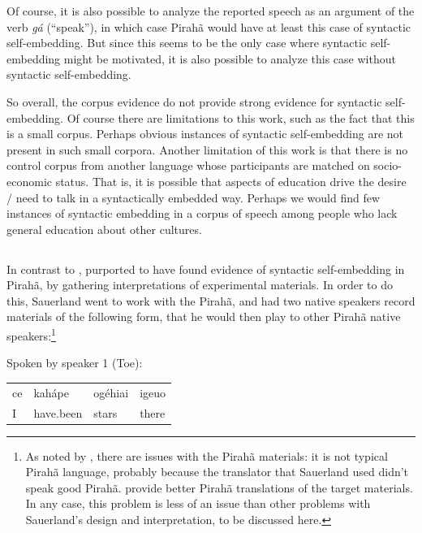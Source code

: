 \documentclass{article}
\begin{document}
Of course, it is also possible to analyze the reported speech as an argument of the verb \textit{gá} (``speak''), in which case Pirahã would have at least this case of syntactic self-embedding.  But since this seems to be the only case where syntactic self-embedding might be motivated, it is also possible to analyze this case without syntactic self-embedding.

So overall, the corpus evidence do not provide strong evidence for syntactic self-embedding. Of course there are limitations to this work, such as the fact that this is a small corpus.  Perhaps obvious instances of syntactic self-embedding are not present in such small corpora.  Another limitation of this work is that there is no control corpus from another language whose participants are matched on socio-economic status.  That is, it is possible that aspects of education drive the desire / need to talk in a syntactically embedded way.  Perhaps we would find few instances of syntactic embedding in a corpus of speech among people who lack general education about other cultures.

\subsection{}
\label{sauerland_sec}

In contrast to \citet{futrell2016corpus}, \citet{sauerland2018false} purported to have found evidence of syntactic self-embedding in Pirahã, by gathering interpretations of experimental materials. In order to do this, Sauerland went to work with the Pirahã, and had two native speakers record materials of the following form, that he would then play to other Pirahã native speakers:\footnote{As noted by \citet{everett2019recursion}, there are issues with the Pirahã materials: it is not typical Pirahã language, probably because the translator that Sauerland used didn't speak good Pirahã. \citet{everett2019recursion} provide better Pirahã translations of the target materials. In any case, this problem is less of an issue than other problems with Sauerland's design and interpretation, to be discussed here.}

\eal
\label{sauerland_ex}
\ex \label{sauerland_ex1} Spoken by speaker 1 (Toe):\\
\begin{tabular}{@{}l l l l}
ce & kahápe & ogéhiai & igeuo \\ 
I & have.been & stars & there\\
\end{tabular}
\end{document}
